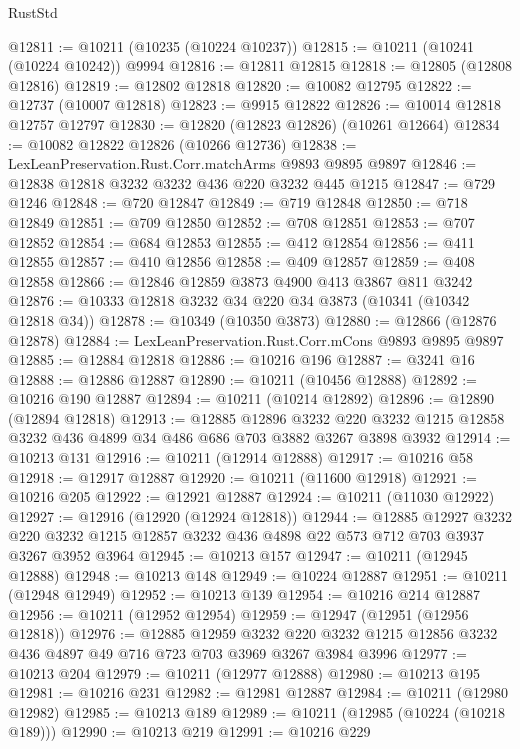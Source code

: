 \begin{lexlean}{RustStd}
\begin{coremodule}
{\begin{coremodule}
{{{{{{{{{{{{{{{{{{{{{{{{{@12811 := @10211 (@10235 (@10224 @10237))
@12815 := @10211 (@10241 (@10224 @10242)) @9994
@12816 := @12811 @12815
@12818 := @12805 (@12808 @12816)
@12819 := @12802 @12818
@12820 := @10082 @12795
@12822 := @12737 (@10007 @12818)
@12823 := @9915 @12822
@12826 := @10014 @12818 @12757 @12797
@12830 := @12820 (@12823 @12826) (@10261 @12664)
@12834 := @10082 @12822 @12826 (@10266 @12736)
@12838 := LexLeanPreservation.Rust.Corr.matchArms @9893 @9895 @9897
@12846 := @12838 @12818 @3232 @3232 @436 @220 @3232 @445 @1215
@12847 := @729 @1246
@12848 := @720 @12847
@12849 := @719 @12848
@12850 := @718 @12849
@12851 := @709 @12850
@12852 := @708 @12851
@12853 := @707 @12852
@12854 := @684 @12853
@12855 := @412 @12854
@12856 := @411 @12855
@12857 := @410 @12856
@12858 := @409 @12857
@12859 := @408 @12858
@12866 := @12846 @12859 @3873 @4900 @413 @3867 @811 @3242
@12876 := @10333 @12818 @3232 @34 @220 @34 @3873 (@10341 (@10342 @12818 @34))
@12878 := @10349 (@10350 @3873)
@12880 := @12866 (@12876 @12878)
@12884 := LexLeanPreservation.Rust.Corr.mCons @9893 @9895 @9897
@12885 := @12884 @12818
@12886 := @10216 @196
@12887 := @3241 @16
@12888 := @12886 @12887
@12890 := @10211 (@10456 @12888)
@12892 := @10216 @190 @12887
@12894 := @10211 (@10214 @12892)
@12896 := @12890 (@12894 @12818)
@12913 := @12885
    @12896
    @3232
    @220
    @3232
    @1215
    @12858
    @3232
    @436
    @4899
    @34
    @486
    @686
    @703
    @3882
    @3267
    @3898
    @3932
@12914 := @10213 @131
@12916 := @10211 (@12914 @12888)
@12917 := @10216 @58
@12918 := @12917 @12887
@12920 := @10211 (@11600 @12918)
@12921 := @10216 @205
@12922 := @12921 @12887
@12924 := @10211 (@11030 @12922)
@12927 := @12916 (@12920 (@12924 @12818))
@12944 := @12885
    @12927
    @3232
    @220
    @3232
    @1215
    @12857
    @3232
    @436
    @4898
    @22
    @573
    @712
    @703
    @3937
    @3267
    @3952
    @3964
@12945 := @10213 @157
@12947 := @10211 (@12945 @12888)
@12948 := @10213 @148
@12949 := @10224 @12887
@12951 := @10211 (@12948 @12949)
@12952 := @10213 @139
@12954 := @10216 @214 @12887
@12956 := @10211 (@12952 @12954)
@12959 := @12947 (@12951 (@12956 @12818))
@12976 := @12885
    @12959
    @3232
    @220
    @3232
    @1215
    @12856
    @3232
    @436
    @4897
    @49
    @716
    @723
    @703
    @3969
    @3267
    @3984
    @3996
@12977 := @10213 @204
@12979 := @10211 (@12977 @12888)
@12980 := @10213 @195
@12981 := @10216 @231
@12982 := @12981 @12887
@12984 := @10211 (@12980 @12982)
@12985 := @10213 @189
@12989 := @10211 (@12985 (@10224 (@10218 @189)))
@12990 := @10213 @219
@12991 := @10216 @229
}}}}}}}}}}}}}}}}}}}}}}}}}
\end{coremodule}}
\end{coremodule}
\end{lexlean}
